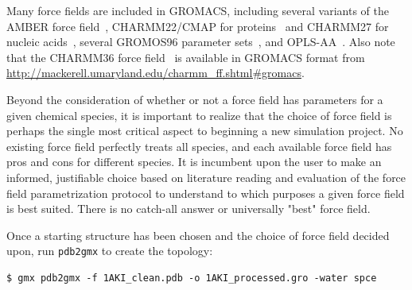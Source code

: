 \documentclass[9pt,tutorial,pubversion]{livecoms}
\begin{document}
Many force fields are included in GROMACS, including several variants of the AMBER force field~\cite{Cornell1994,Kollman1996,Wang2000,Garcia2002,Duan2003,Hornak2006,LindorffLarsen2010}, CHARMM22/CMAP for proteins~\cite{MacKerell1998,MacKerell2004} and CHARMM27 for nucleic acids~\cite{Foloppe2000,MacKerell2000}, several GROMOS96 parameter sets~\cite{Daura1998,Schuler2001,Oostenbrink2004,Schmid2011}, and OPLS-AA~\cite{Kaminski2001}. Also note that the CHARMM36 force field~\cite{Best2012,Hart2012,Denning2011,Klauda2010,Huang2016} is available in GROMACS format from \url{http://mackerell.umaryland.edu/charmm_ff.shtml#gromacs}.

Beyond the consideration of whether or not a force field has parameters for a given chemical species, it is important to realize that the choice of force field is perhaps the single most critical aspect to beginning a new simulation project. No existing force field perfectly treats all species, and each available force field has pros and cons for different species. It is incumbent upon the user to make an informed, justifiable choice based on literature reading and evaluation of the force field parametrization protocol to understand to which purposes a given force field is best suited. There is no catch-all answer or universally "best" force field.

Once a starting structure has been chosen and the choice of force field decided upon, run \texttt{pdb2gmx} to create the topology:

\begin{lstlisting}
$ gmx pdb2gmx -f 1AKI_clean.pdb -o 1AKI_processed.gro -water spce
\end{lstlisting}
\end{document}
